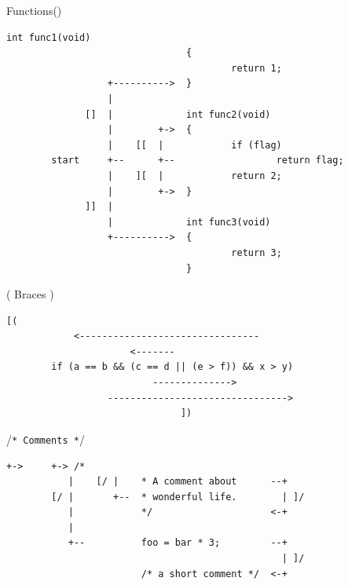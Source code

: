 \documentclass[14pt,svgnames,compress]{beamer}
\newcommand\hl[1]{\textcolor{HlColor}{#1}}
\newcommand\framesubtitlefontsize{\huge}
\newcommand\singleframesubtitle[1]{
    \begin{center}
        \framesubtitlefontsize #1
    \end{center}
}
\begin{document}
\begin{frame}
    \singleframesubtitle{Functions()}
\end{frame}

\begin{frame}[fragile]
    \scriptsize
    \begin{Verbatim}[gobble=8]
                                int func1(void)
                                {
                                        return 1;
                  +---------->  }
                  |
              []  |             int func2(void)
                  |        +->  {
                  |    [[  |            if (flag)
        start     +--      +--                  return flag;
                  |    ][  |            return 2;
                  |        +->  }
              ]]  |
                  |             int func3(void)
                  +---------->  {
                                        return 3;
                                }
    \end{Verbatim}
\end{frame}

\begin{frame}
    \singleframesubtitle{ \hl{(} Braces \hl{)} }
\end{frame}

\begin{frame}[fragile]
    \footnotesize
    \begin{Verbatim}[gobble=4]
                          [(
            <--------------------------------
                      <-------
        if (a == b && (c == d || (e > f)) && x > y)
                          -------------->
                  -------------------------------->
                               ])
    \end{Verbatim}
\end{frame}

\begin{frame}
    \singleframesubtitle{\hl{/}\Verb|* Comments *|\hl{/}}
\end{frame}

\begin{frame}[fragile]
    \footnotesize
    \begin{Verbatim}[gobble=8]
           +->     +-> /*
           |    [/ |    * A comment about      --+
        [/ |       +--  * wonderful life.        | ]/
           |            */                     <-+
           |
           +--          foo = bar * 3;         --+
                                                 | ]/
                        /* a short comment */  <-+
    \end{Verbatim}
\end{frame}
\end{document}
